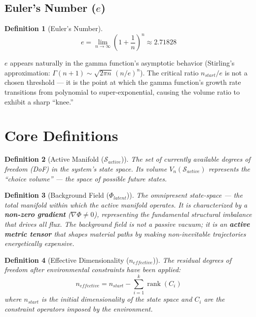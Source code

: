 \documentclass[11pt, a4paper]{article}
\newtheorem{definition}{Definition}[section]
\begin{document}
\subsection{Euler's Number ($e$)}

\begin{definition}[Euler's Number]
\begin{equation}
  e = \lim_{n \to \infty} \left(1 + \frac{1}{n}\right)^n \approx 2.71828
\end{equation}
\end{definition}

$e$ appears naturally in the gamma function's asymptotic behavior (Stirling's
approximation: $\Gamma(n+1) \sim \sqrt{2\pi n}\,(n/e)^n$). The critical
ratio $n_{start}/e$ is not a chosen threshold --- it is the point at which
the gamma function's growth rate transitions from polynomial to
super-exponential, causing the volume ratio to exhibit a sharp ``knee.''

\section{Core Definitions}

\begin{definition}[Active Manifold ($\mathcal{S}_{active}$)]
The set of currently available degrees of freedom (DoF) in the system's
state space. Its volume $V_n(\mathcal{S}_{active})$ represents the
``choice volume'' --- the space of possible future states.
\end{definition}

\begin{definition}[Background Field ($\Phi_{latent}$)]
The omnipresent state-space --- the total manifold within which the active
manifold operates. It is characterized by a \textbf{non-zero gradient}
($\nabla \Phi \neq 0$), representing the fundamental structural imbalance
that drives all flux. The background field is not a passive vacuum; it is
an \textbf{active metric tensor} that shapes material paths by making
non-inevitable trajectories energetically expensive.
\end{definition}

\begin{definition}[Effective Dimensionality ($n_{effective}$)]
The residual degrees of freedom after environmental constraints have been
applied:
\begin{equation}
  n_{effective} = n_{start} - \sum_{i=1}^{k} \operatorname{rank}(C_i)
  \label{eq:neff}
\end{equation}
where $n_{start}$ is the initial dimensionality of the state space and
$C_i$ are the constraint operators imposed by the environment.
\end{definition}
\end{document}
